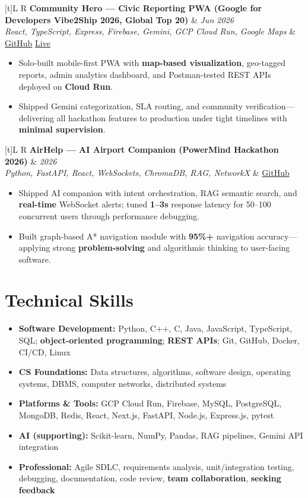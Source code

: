 \documentclass[a4paper,10pt]{article}
\newcommand{\resumeProject}[4]{%
  \vspace{0.5mm}
  \noindent
  \begin{tabularx}{\textwidth}[t]{L R}
    \textbf{#1} & \textit{#3} \\
    \textit{#2} & #4 \\
  \end{tabularx}
  \vspace{-0.5mm}%
}
\begin{document}
\resumeProject
  {Community Hero --- Civic Reporting PWA (Google for Developers Vibe2Ship 2026, Global Top 20)}
  {React, TypeScript, Express, Firebase, Gemini, GCP Cloud Run, Google Maps}
  {Jun 2026}
  {\href{https://github.com/Ojas-Srivastava05/community-hero}{GitHub} \textbar{} \href{https://community-hero-987477089222.asia-south1.run.app}{Live}}
\begin{itemize}
  \item Solo-built mobile-first PWA with \textbf{map-based visualization}, geo-tagged reports, admin analytics dashboard, and Postman-tested REST APIs deployed on \textbf{Cloud Run}.
  \item Shipped Gemini categorization, SLA routing, and community verification---delivering all hackathon features to production under tight timelines with \textbf{minimal supervision}.
\end{itemize}

\resumeProject
  {AirHelp --- AI Airport Companion (PowerMind Hackathon 2026)}
  {Python, FastAPI, React, WebSockets, ChromaDB, RAG, NetworkX}
  {2026}
  {\href{https://github.com/Ojas-Srivastava05/AirHelp-AI-Airport-Assistant}{GitHub}}
\begin{itemize}
  \item Shipped AI companion with intent orchestration, RAG semantic search, and \textbf{real-time} WebSocket alerts; tuned \textbf{1--3s} response latency for 50--100 concurrent users through performance debugging.
  \item Built graph-based A* navigation module with \textbf{95\%+} navigation accuracy---applying strong \textbf{problem-solving} and algorithmic thinking to user-facing software.
\end{itemize}

\section{Technical Skills}
\small
\begin{itemize}[label={}]
  \item \textbf{Software Development:} Python, C++, C, Java, JavaScript, TypeScript, SQL; \textbf{object-oriented programming}; \textbf{REST APIs}; Git, GitHub, Docker, CI/CD, Linux
  \item \textbf{CS Foundations:} Data structures, algorithms, software design, operating systems, DBMS, computer networks, distributed systems
  \item \textbf{Platforms \& Tools:} GCP Cloud Run, Firebase, MySQL, PostgreSQL, MongoDB, Redis, React, Next.js, FastAPI, Node.js, Express.js, pytest
  \item \textbf{AI (supporting):} Scikit-learn, NumPy, Pandas, RAG pipelines, Gemini API integration
  \item \textbf{Professional:} Agile SDLC, requirements analysis, unit/integration testing, debugging, documentation, code review, \textbf{team collaboration}, \textbf{seeking feedback}
\end{itemize}
\end{document}

